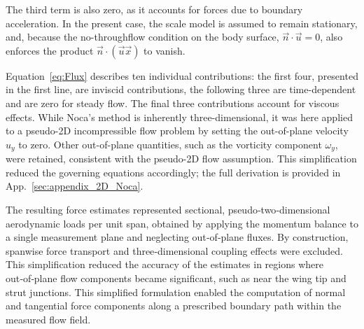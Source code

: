 \documentclass[wes, manuscript]{copernicus}
\begin{document}
The third term is also zero, as it accounts for forces due to boundary acceleration. In the present case, the scale model is assumed to remain stationary, and, because the no-throughflow condition on the body surface, $\vec{n}\cdot\vec{u}=0$, also enforces the product $\vec{n}\cdot(\vec{u}\vec{x})$ to vanish.


Equation~\eqref{eq:Flux} describes ten individual contributions: the first four, presented in the first line, are inviscid contributions, the following three are time-dependent and are zero for steady flow. The final three contributions account for viscous effects. While Noca’s method is inherently three-dimensional, it was here applied to a pseudo-2D incompressible flow problem by setting the out-of-plane velocity $u_y$ to zero. Other out-of-plane quantities, such as the vorticity component $\omega_y$, were retained, consistent with the pseudo-2D flow assumption. This simplification reduced the governing equations accordingly; the full derivation is provided in App.~\ref{sec:appendix_2D_Noca}.

The resulting force estimates represented sectional, pseudo‑two‑dimensional aerodynamic loads per unit span, obtained by applying the momentum balance to a single measurement plane and neglecting out‑of‑plane fluxes. By construction, spanwise force transport and three‑dimensional coupling effects were excluded. This simplification reduced the accuracy of the estimates in regions where out‑of‑plane flow components became significant, such as near the wing tip and strut junctions. This simplified formulation enabled the computation of normal and tangential force components along a prescribed boundary path within the measured flow field.
\end{document}
